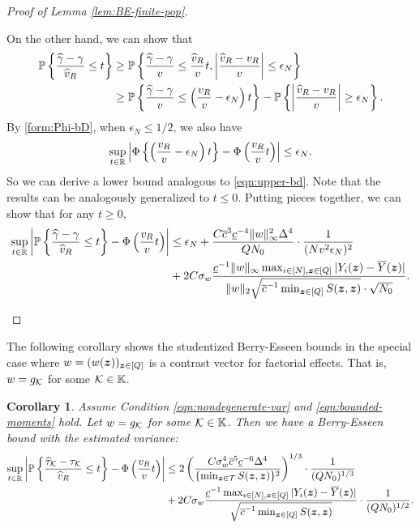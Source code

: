 \documentclass[12pt]{article}
\newtheorem{corollary}{Corollary}
\begin{document}
{\begin{proof}[Proof of Lemma \ref{lem:BE-finite-pop}]
\begin{enumerate}
    On the other hand, we can show that
    \begin{align}
        {\mathbb{P}}\left\{\frac{{\widehat{\gamma}} - \gamma}{\widehat{v}_R} \le t\right\} &\ge 
        {\mathbb{P}}\left\{\frac{{\widehat{\gamma}} - \gamma}{{v}} \le \frac{\widehat{v}_R}{{v}}t, \left|\frac{\widehat{v}_R - v_R}{v}\right| \le \epsilon_N\right\} \notag\\
        &\ge {\mathbb{P}}\left\{\frac{{\widehat{\gamma}} - \gamma}{{v}} \le \left(\frac{{v}_R}{v} - \epsilon_N\right)t\right\} - {\mathbb{P}}\left\{ \left|\frac{\widehat{v}_R - v_R}{v}\right| \ge \epsilon_N\right\}.\label{eqn:upper-bd}
    \end{align}
    By \eqref{form:Phi-bD}, when $\epsilon_N\le 1/2$, we also have
    \begin{align*}
        \sup_{t\in{\mathbb{R}}}\left|\Phi\left\{\left(\frac{{v}_R}{v} - \epsilon_N\right)t \right\} - \Phi\left(\frac{v_R}{v}t\right)\right| \le \epsilon_N. 
    \end{align*}
    So we can derive a lower bound analogous to \eqref{eqn:upper-bd}. Note that the results can be analogously generalized to $t\le 0$. Putting pieces together, we can show that for any $t\ge 0$,
    \begin{align*}
        \sup_{t\in{\mathbb{R}}}\left|{\mathbb{P}}\left\{\frac{{\widehat{\gamma}} - \gamma}{\widehat{v}_R} \le t\right\} - \Phi\left(\frac{v_R}{v}t\right)\right| &\le
        \epsilon_N +  \frac{C\overline{c}^3\underline{c}^{-4} \|w\|_\infty^2 \Delta^4 }{QN_0}\cdot \frac{1}{(Nv^2\epsilon_N)^2} \\
        &+ 2C\sigma_w   \frac{\underline{c}^{-1}  \|w\|_{\infty}   \max_{i\in[N],{\boldsymbol{z}}\in[Q]}|Y_i({\boldsymbol{z}})-\overline{Y}({\boldsymbol{z}})|}{\|w\|_2\sqrt{\overline{c}^{-1} \min_{{\boldsymbol{z}}\in[Q]} S({\boldsymbol{z}},{\boldsymbol{z}})}\cdot \sqrt{ N_0}}.
    \end{align*}
\end{enumerate}


\end{proof}
}

The following corollary shows the studentized Berry-Esseen bounds in the special case where $w = (w({\boldsymbol{z}}))_{{\boldsymbol{z}}\in[Q]}$ is a contrast vector for factorial effects. That is, $ w = g_{\mathcal{K}}$ for some ${\mathcal{K}} \in {\mathbb{K}} $. 

\begin{corollary}\label{cor:factorial-student-be}
Assume Condition \eqref{eqn:nondegenerate-var} and \eqref{eqn:bounded-moments} hold. Let $ w = g_{\mathcal{K}}$ for some ${\mathcal{K}} \in {\mathbb{K}} $. Then we have a Berry-Esseen bound with the estimated variance:
\begin{align*}
    \sup_{t\in{\mathbb{R}}}\left|{\mathbb{P}}\left\{\frac{{\widehat{\tau}}_{\mathcal{K}} - \tau_{\mathcal{K}}}{\widehat{v}_R} \le t\right\} - \Phi\left(\frac{v_R}{v}t\right)\right| &\le
          2\left(\frac{C\sigma_w^4\overline{c}^5\underline{c}^{-6}  \Delta^4 }{\{\min_{{\boldsymbol{z}}\in{\mathcal{T}}}S({\boldsymbol{z}},{\boldsymbol{z}})\}^2}\right)^{1/3}\cdot\frac{1}{(QN_0)^{1/3}} \\
        &+ 2C\sigma_w   \frac{\underline{c}^{-1}     \max_{i\in[N],{\boldsymbol{z}}\in[Q]}|Y_i({\boldsymbol{z}})-\overline{Y}({\boldsymbol{z}})|}{ \sqrt{\overline{c}^{-1} \min_{{\boldsymbol{z}}\in[Q]} S({\boldsymbol{z}},{\boldsymbol{z}})}}\cdot\frac{1}{(QN_0)^{1/2}}.
\end{align*}
\end{corollary}
\end{document}
